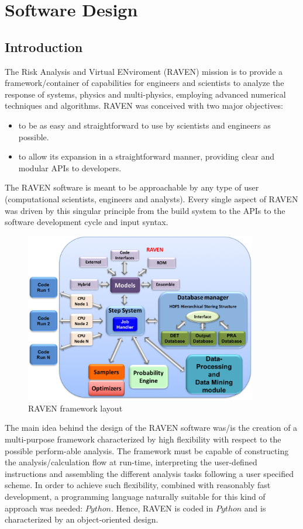 \section{Software Design}
\subsection{Introduction}
The Risk Analysis and Virtual ENviroment (RAVEN) mission is to provide a framework/container of capabilities for 
engineers and scientists to analyze the response of systems, physics and multi-physics, employing advanced numerical
techniques and algorithms.
RAVEN was conceived with two major objectives: 
\begin{itemize}
  \item  to be as easy and straightforward to use by scientists and engineers as possible. 
  \item to allow its expansion in a straightforward manner, providing clear and modular APIs  to developers.
\end{itemize}

The RAVEN software is meant to be approachable by any type of user (computational scientists, engineers and analysts). 
Every single aspect of RAVEN was driven by this singular principle from the build system to the APIs to the software development cycle and input syntax.

\begin{figure}[ht]
  \centering
  \includegraphics[width=0.9\textwidth]  {pics/RavenFramework.png}
  \caption{RAVEN framework layout}
  \label{fig:RAVENframeworkLayout}
\end{figure}

The main idea behind the design of the RAVEN software was/is the creation of a multi-purpose framework characterized by 
high flexibility with respect to the possible perform-able analysis. The framework must be capable of constructing the 
analysis/calculation flow at run-time, interpreting the user-defined instructions and assembling the different analysis tasks 
following a user specified scheme.
In order to achieve such flexibility, combined with reasonably fast development, a programming language naturally suitable 
for this kind of approach was needed: $Python$.
Hence, RAVEN is coded in $Python$ and is characterized by an object-oriented design. 

